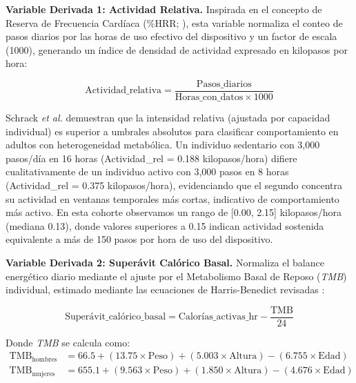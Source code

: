 \textbf{Variable Derivada 1: Actividad Relativa.} Inspirada en el concepto de Reserva de Frecuencia Cardíaca (\%HRR; \cite{Schrack2018}), esta variable normaliza el conteo de pasos diarios por las horas de uso efectivo del dispositivo y un factor de escala (1000), generando un índice de densidad de actividad expresado en kilopasos por hora:

\begin{equation}
\text{Actividad\_relativa} = \frac{\text{Pasos\_diarios}}{\text{Horas\_con\_datos} \times 1000}
\label{eq:actividad_relativa}
\end{equation}

Schrack \textit{et al.} \cite{Schrack2018} demuestran que la intensidad relativa (ajustada por capacidad individual) es superior a umbrales absolutos para clasificar comportamiento en adultos con heterogeneidad metabólica. Un individuo sedentario con 3,000 pasos/día en 16 horas (Actividad\_rel = 0.188 kilopasos/hora) difiere cualitativamente de un individuo activo con 3,000 pasos en 8 horas (Actividad\_rel = 0.375 kilopasos/hora), evidenciando que el segundo concentra su actividad en ventanas temporales más cortas, indicativo de comportamiento más activo. En esta cohorte observamos un rango de [0.00, 2.15] kilopasos/hora (mediana 0.13), donde valores superiores a 0.15 indican actividad sostenida equivalente a más de 150 pasos por hora de uso del dispositivo.

\textbf{Variable Derivada 2: Superávit Calórico Basal.} Normaliza el balance energético diario mediante el ajuste por el Metabolismo Basal de Reposo (\textit{TMB}) individual, estimado mediante las ecuaciones de Harris-Benedict revisadas \cite{Harris1918}:

\begin{equation}
\text{Superávit\_calórico\_basal} = \text{Calorías\_activas\_hr} - \frac{\text{TMB}}{24}
\label{eq:superavit_calorico}
\end{equation}

Donde \textit{TMB} se calcula como:
\begin{align}
\text{TMB}_{\text{hombres}} &= 66.5 + (13.75 \times \text{Peso}) + (5.003 \times \text{Altura}) - (6.755 \times \text{Edad}) \label{eq:tmb_hombres} \\
\text{TMB}_{\text{mujeres}} &= 655.1 + (9.563 \times \text{Peso}) + (1.850 \times \text{Altura}) - (4.676 \times \text{Edad}) \label{eq:tmb_mujeres}
\end{align}

